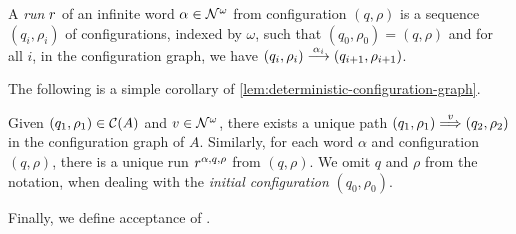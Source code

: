 \begin{definition}
 A \emph{run} $r$ of an infinite word $\alpha \in \mathcal{N}^\omega$ from configuration $(q,\rho)$ is a sequence $(q_i,\rho_i)$ of configurations, indexed by $\omega$, such that $(q_0,\rho_0)=(q,\rho)$ and for all $i$, in the configuration graph, we have $(q_i,\rho_i) \overset{\alpha_i}{\longrightarrow} (q_{i+1},\rho_{i+1})$. 
\end{definition}

\noindent The following is a simple corollary of  \cref{lem:deterministic-configuration-graph}.

\begin{proposition}
\label{prop:unique-path}
Given $(q_1,\rho_1) \in \mathcal{C}(A)$ and $v \in \mathcal{N}^\omega$, there exists a unique path $(q_1,\rho_1) \overset{v}{\Longrightarrow} (q_2,\rho_2)$ in the configuration graph of $A$. Similarly, for each word $\alpha$ and configuration $(q,\rho)$, there is a unique run $r^{\alpha,q,\rho}$ from $(q,\rho)$. We omit $q$ and $\rho$ from the notation, when dealing with the \emph{initial configuration} $(q_0,\rho_0)$.
\end{proposition}

\noindent Finally, we define acceptance of \hdmas. 


